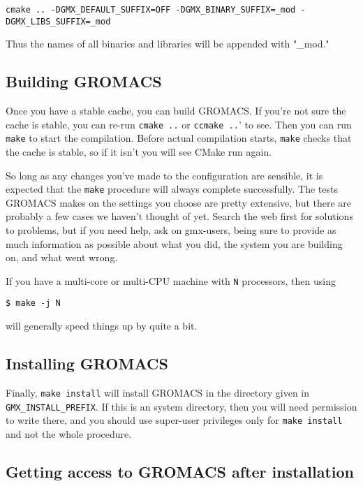 \documentclass{article}[12pt,a4paper,twoside]
\newcommand{\gromacs}{GROMACS}
\newcommand{\cmake}{CMake}
\begin{document}
\begin{verbatim}
cmake .. -DGMX_DEFAULT_SUFFIX=OFF -DGMX_BINARY_SUFFIX=_mod -DGMX_LIBS_SUFFIX=_mod
\end{verbatim}

Thus the names of all binaries and libraries will be appended with
"\_mod."

\subsection{Building \gromacs{}}

Once you have a stable cache, you can build \gromacs{}. If you're not
sure the cache is stable, you can re-run \verb+cmake ..+ or
\verb+ccmake ..+' to see. Then you can run \verb+make+ to start the
compilation. Before actual compilation starts, \verb+make+ checks
that the cache is stable, so if it isn't you will see \cmake{} run
again.

So long as any changes you've made to the configuration are sensible,
it is expected that the \verb+make+ procedure will always complete
successfully. The tests \gromacs{} makes on the settings you choose
are pretty extensive, but there are probably a few cases we haven't
thought of yet. Search the web first for solutions to problems, but if
you need help, ask on gmx-users, being sure to provide as much
information as possible about what you did, the system you are
building on, and what went wrong.

If you have a multi-core or multi-CPU machine with \verb+N+
processors, then using
\begin{verbatim}
$ make -j N
\end{verbatim}
will generally speed things up by quite a bit.

\subsection{Installing \gromacs{}}

Finally, \verb+make install+ will install \gromacs{} in the
directory given in \verb+GMX_INSTALL_PREFIX+. If this is an system
directory, then you will need permission to write there, and you
should use super-user privileges only for \verb+make install+ and
not the whole procedure.

\subsection{Getting access to \gromacs{} after installation}
\end{document}
